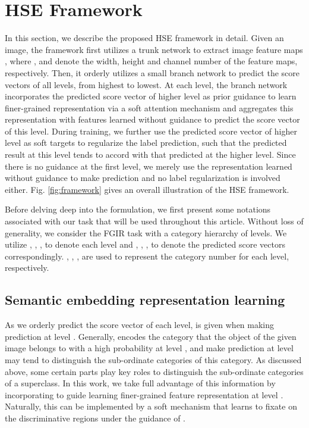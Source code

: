\documentclass[sigconf]{acmart}
\begin{document}
\section{HSE Framework}

In this section, we describe the proposed HSE framework in detail. Given an image, the framework first utilizes a trunk network to extract image feature maps , where ,  and  denote the width, height and channel number of the feature maps, respectively. Then, it orderly utilizes a small branch network to predict the score vectors of all levels, from highest to lowest. At each level, the branch network incorporates the predicted score vector of higher level as prior guidance to learn finer-grained representation via a soft attention mechanism and aggregates this representation with features learned without guidance to predict the score vector of this level. During training, we further use the predicted score vector of higher level as soft targets to regularize the label prediction, such that the predicted result at this level tends to accord with that predicted at the higher level. Since there is no guidance at the first level, we merely use the representation learned without guidance to make prediction and no label regularization is involved either. Fig. \ref{fig:framework} gives an overall illustration of the HSE framework.


Before delving deep into the formulation, we first present some notations associated with our task that will be used throughout this article. Without loss of generality, we consider the FGIR task with a category hierarchy of  levels. We utilize , , ,  to denote each level and , , ,  to denote the predicted score vectors correspondingly. , , ,  are used to represent the category number for each level, respectively.


\subsection{Semantic embedding representation learning}
As we orderly predict the score vector of each level,  is given when making prediction at level . Generally,  encodes the category that the object of the given image belongs to with a high probability at level , and make prediction at level  may tend to distinguish the sub-ordinate categories of this category. As discussed above, some certain parts play key roles to distinguish the sub-ordinate categories of a superclass. In this work, we take full advantage of this information by incorporating  to guide learning finer-grained feature representation at level . Naturally, this can be implemented by a soft mechanism that learns to fixate on the discriminative regions under the guidance of .
\end{document}
